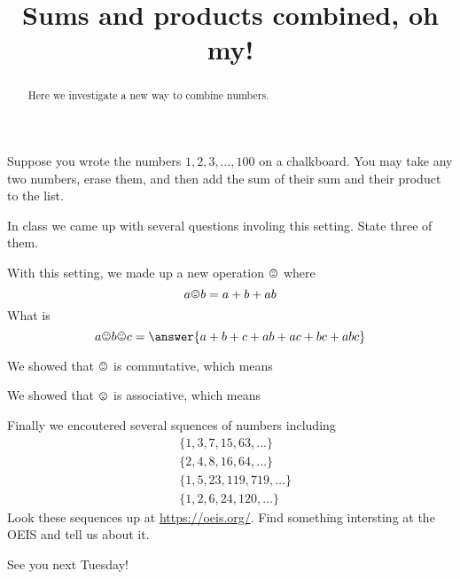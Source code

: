 \documentclass[handout,nooutcomes,space]{ximera}
\title{Sums and products combined, oh my!}
\begin{document}
\begin{abstract}
Here we investigate a new way to combine numbers.
\end{abstract}
\maketitle

Suppose you wrote the numbers $1,2,3,\dots,100$ on a chalkboard. You
may take any two numbers, erase them, and then add the sum of their
sum and their product to the list.

\begin{problem}
In class we came up with several questions involing this setting. State three of them. 
\begin{freeResponse}
\end{freeResponse}
\end{problem}

\begin{problem}
  With this setting, we made up a new operation $\pt$ where
  \[
  a\pt b = a+b + ab
  \]
  What is
  \[
  a\pt b\pt c = \answer{a+b+c+ab+ac+bc+abc}
  \]
\end{problem}

\begin{problem}
We showed that $\pt$ is commutative, which means
\begin{multipleChoice}
\end{multipleChoice}
\end{problem}

\begin{problem}
We showed that $\pt$ is associative, which means
\begin{multipleChoice}
\end{multipleChoice}
\end{problem}

\begin{problem}
Finally we encoutered several squences of numbers including
\begin{align*}
  &\{ 1, 3, 7, 15, 63,\dots\}\\
  &\{ 2, 4, 8, 16, 64,\dots\}\\
  &\{ 1, 5, 23, 119, 719,\dots\}\\
  &\{ 1, 2, 6, 24, 120,\dots\}
\end{align*}
Look these sequences up at \href{https://oeis.org/}{https://oeis.org/}. Find something intersting at the OEIS and tell us about it.
\begin{freeResponse}
\end{freeResponse}
See you next Tuesday!
\end{problem}
\end{document}
